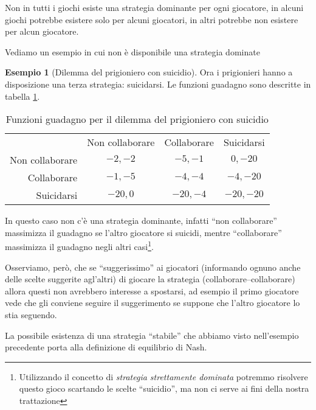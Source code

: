 \documentclass[a4paper]{article}
\theoremstyle{plain}
\theoremstyle{definition}
\newtheorem{myes}[myteo]{Esempio}
\theoremstyle{remark}
\begin{document}
Non in tutti i giochi esiste una strategia dominante per ogni
giocatore, in alcuni giochi potrebbe esistere solo per alcuni
giocatori, in altri potrebbe non esistere per alcun giocatore.

Vediamo un esempio in cui non è disponibile una strategia dominate

\begin{myes}[Dilemma del prigioniero con suicidio]
  Ora i prigionieri hanno a disposizione una terza strategia:
  suicidarsi. Le funzioni guadagno sono descritte in tabella
  \ref{tab:u1u2-prigioniero-suicidio}.
  \begin{table}[!ht]
    \centering
    \begin{tabular}{rccc}
      & Non collaborare & Collaborare & Suicidarsi \\
      \cline{2-4}
      Non collaborare & \multicolumn{1}{|c|}{$-2,-2$} & \multicolumn{1}{|c|}{$-5,-1$} & \multicolumn{1}{|c|}{$0,-20$}  \\
      \cline{2-4}
      Collaborare & \multicolumn{1}{|c|}{$-1,-5$} & \multicolumn{1}{|c|}{$-4,-4$}  & \multicolumn{1}{|c|}{$-4,-20$} \\
      \cline{2-4}
      Suicidarsi & \multicolumn{1}{|c|}{$-20,0$} & \multicolumn{1}{|c|}{$-20,-4$}  & \multicolumn{1}{|c|}{$-20,-20$} \\
      \cline{2-4}
    \end{tabular}
    \caption{Funzioni guadagno per il dilemma del prigioniero con
      suicidio}
    \label{tab:u1u2-prigioniero-suicidio}
  \end{table}

  In questo caso non c'è una strategia dominante, infatti ``non
  collaborare'' massimizza il guadagno se l'altro giocatore si
  suicidi, mentre ``collaborare'' massimizza il guadagno negli altri
  casi\footnote{Utilizzando il concetto di \textit{strategia
      strettamente dominata} potremmo risolvere questo gioco scartando
    le scelte ``suicidio'', ma non ci serve ai fini della nostra
    trattazione}.

  Osserviamo, però, che se ``suggerissimo'' ai giocatori (informando
  ognuno anche delle scelte suggerite agl'altri) di giocare la
  strategia (collaborare--collaborare) allora questi non avrebbero
  interesse a spostarsi, ad esempio il primo giocatore vede che gli
  conviene seguire il suggerimento se suppone che l'altro giocatore lo
  stia seguendo.
\end{myes}

La possibile esistenza di una strategia ``stabile'' che abbiamo visto
nell'esempio precedente porta alla definizione di equilibrio di Nash.
\end{document}
